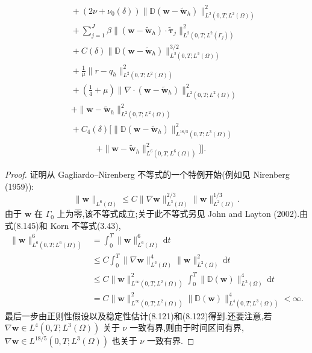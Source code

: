 \begin{theorem}
\begin{equation}
\begin{aligned}
&\quad+(2\nu+\nu_0(\delta))
 \|\mathbb{D}(\bm{w}-\widetilde{\bm{w}}_h)\|_{L^2(0,T;L^2(\Omega))}^2\\
&\quad+\sum_{j=1}^J\beta
 \|(\bm{w}-\widetilde{\bm{w}}_h)\cdot\widetilde{\symbf{\tau}}_j
   \|_{L^2(0,T;L^2(\Gamma_j))}^2\\
&\quad+C(\delta)
 \|\mathbb{D}(\bm{w}-\widetilde{\bm{w}}_h)\|_{L^3(0,T;L^3(\Omega))}^{3/2}\\
&\quad+\frac1\mu\|r-q_h\|_{L^2(0,T;L^2(\Omega))}^2\\
&\quad+\left(\frac14+\mu\right)
  \|\nabla\cdot(\bm{w}-\widetilde{\bm{w}}_h)\|_{L^2(0,T;L^2(\Omega))}^2\\
&\quad+\|\bm{w}-\widetilde{\bm{w}}_h\|_{L^2(0,T;L^2(\Omega))}^2\\
&\quad+C_4(\delta)\Biggl[
 \|\mathbb{D}(\bm{w}-\widetilde{\bm{w}}_h)\|_{L^{18/5}(0,T;L^3(\Omega))}^2\\
&\qquad\qquad+\|\bm{w}-\widetilde{\bm{w}}_h\|_{L^6(0,T;L^6(\Omega))}^2
 \Biggr]\Biggr].
\end{aligned}
\end{equation}
\begin{proof}
证明从 Gagliardo--Nirenberg 不等式的一个特例开始(例如见 Nirenberg (1959)):
\begin{equation}\label{eq:smagorinsky-gagliardo-nirenberg}
\|\bm{w}\|_{L^6(\Omega)}
\le C\|\nabla\bm{w}\|_{L^3(\Omega)}^{2/3}
       \|\bm{w}\|_{L^2(\Omega)}^{1/3}.
\end{equation}
由于 $\bm{w}$ 在 $\Gamma_0$ 上为零,该不等式成立;关于此不等式另见 John and Layton (2002).由式(8.145)和 Korn 不等式(3.43),
\[
\begin{aligned}
\|\bm{w}\|_{L^6(0,T;L^6(\Omega))}^6
&=\int_0^T\|\bm{w}\|_{L^6(\Omega)}^6\,\mathrm{d}t\\
&\le C\int_0^T
 \|\nabla\bm{w}\|_{L^3(\Omega)}^4
 \|\bm{w}\|_{L^2(\Omega)}^2\,\mathrm{d}t\\
&\le C\|\bm{w}\|_{L^\infty(0,T;L^2(\Omega))}^2
 \int_0^T\|\mathbb{D}(\bm{w})\|_{L^3(\Omega)}^4\,\mathrm{d}t\\
&=C\|\bm{w}\|_{L^\infty(0,T;L^2(\Omega))}^2
 \|\mathbb{D}(\bm{w})\|_{L^4(0,T;L^3(\Omega))}^4<\infty.
\end{aligned}
\]
最后一步由正则性假设以及稳定性估计(8.121)和(8.122)得到.还要注意,若
$\nabla\bm{w}\in L^4(0,T;L^3(\Omega))$ 关于 $\nu$ 一致有界,则由于时间区间有界,
$\nabla\bm{w}\in L^{18/5}(0,T;L^3(\Omega))$ 也关于 $\nu$ 一致有界.


\end{proof}
\end{theorem}
